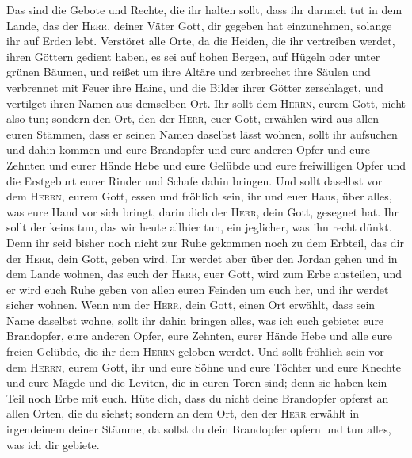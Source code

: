  Das sind die Gebote und Rechte, die ihr halten sollt,
dass ihr darnach tut in dem Lande, das der \textsc{Herr}, deiner Väter
Gott, dir gegeben hat einzunehmen, solange ihr auf Erden lebt.
 Verstöret alle Orte, da die Heiden, die ihr vertreiben
werdet, ihren Göttern gedient haben, es sei auf hohen Bergen, auf Hügeln
oder unter grünen Bäumen,  und reißet um ihre Altäre und
zerbrechet ihre Säulen und verbrennet mit Feuer ihre Haine, und die
Bilder ihrer Götter zerschlaget, und vertilget ihren Namen aus demselben
Ort.  Ihr sollt dem \textsc{Herrn}, eurem Gott, nicht also
tun;  sondern den Ort, den der \textsc{Herr}, euer Gott,
erwählen wird aus allen euren Stämmen, dass er seinen Namen daselbst
lässt wohnen, sollt ihr aufsuchen und dahin kommen  und
eure Brandopfer und eure anderen Opfer und eure Zehnten und eurer Hände
Hebe und eure Gelübde und eure freiwilligen Opfer und die Erstgeburt
eurer Rinder und Schafe dahin bringen.  Und sollt daselbst
vor dem \textsc{Herrn}, eurem Gott, essen und fröhlich sein, ihr und
euer Haus, über alles, was eure Hand vor sich bringt, darin dich der
\textsc{Herr}, dein Gott, gesegnet hat.  Ihr sollt der
keins tun, das wir heute allhier tun, ein jeglicher, was ihn recht
dünkt.  Denn ihr seid bisher noch nicht zur Ruhe gekommen
noch zu dem Erbteil, das dir der \textsc{Herr}, dein Gott, geben wird.
 Ihr werdet aber über den Jordan gehen und in dem Lande
wohnen, das euch der \textsc{Herr}, euer Gott, wird zum Erbe austeilen,
und er wird euch Ruhe geben von allen euren Feinden um euch her, und ihr
werdet sicher wohnen.  Wenn nun der \textsc{Herr}, dein
Gott, einen Ort erwählt, dass sein Name daselbst wohne, sollt ihr dahin
bringen alles, was ich euch gebiete: eure Brandopfer, eure anderen
Opfer, eure Zehnten, eurer Hände Hebe und alle eure freien Gelübde, die
ihr dem \textsc{Herrn} geloben werdet.  Und sollt
fröhlich sein vor dem \textsc{Herrn}, eurem Gott, ihr und eure Söhne und
eure Töchter und eure Knechte und eure Mägde und die Leviten, die in
euren Toren sind; denn sie haben kein Teil noch Erbe mit euch.
 Hüte dich, dass du nicht deine Brandopfer opferst an
allen Orten, die du siehst;  sondern an dem Ort, den der
\textsc{Herr} erwählt in irgendeinem deiner Stämme, da sollst du dein
Brandopfer opfern und tun alles, was ich dir gebiete.

